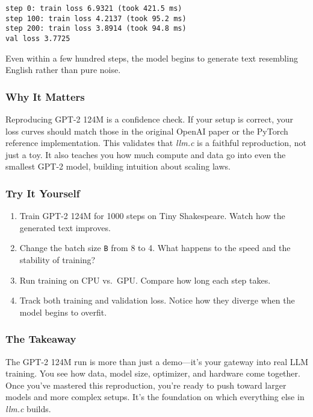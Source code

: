 \documentclass[
  letterpaper,
  DIV=11,
  numbers=noendperiod]{scrreprt}
\providecommand{\tightlist}{%
  \setlength{\itemsep}{0pt}\setlength{\parskip}{0pt}}
\begin{document}
\begin{verbatim}
step 0: train loss 6.9321 (took 421.5 ms)
step 100: train loss 4.2137 (took 95.2 ms)
step 200: train loss 3.8914 (took 94.8 ms)
val loss 3.7725
\end{verbatim}

Even within a few hundred steps, the model begins to generate text
resembling English rather than pure noise.

\subsubsection{Why It Matters}\label{why-it-matters-65}

Reproducing GPT-2 124M is a confidence check. If your setup is correct,
your loss curves should match those in the original OpenAI paper or the
PyTorch reference implementation. This validates that \emph{llm.c} is a
faithful reproduction, not just a toy. It also teaches you how much
compute and data go into even the smallest GPT-2 model, building
intuition about scaling laws.

\subsubsection{Try It Yourself}\label{try-it-yourself-79}

\begin{enumerate}
\def\labelenumi{\arabic{enumi}.}
\tightlist
\item
  Train GPT-2 124M for 1000 steps on Tiny Shakespeare. Watch how the
  generated text improves.
\item
  Change the batch size \texttt{B} from 8 to 4. What happens to the
  speed and the stability of training?
\item
  Run training on CPU vs.~GPU. Compare how long each step takes.
\item
  Track both training and validation loss. Notice how they diverge when
  the model begins to overfit.
\end{enumerate}

\subsubsection{The Takeaway}\label{the-takeaway-80}

The GPT-2 124M run is more than just a demo---it's your gateway into
real LLM training. You see how data, model size, optimizer, and hardware
come together. Once you've mastered this reproduction, you're ready to
push toward larger models and more complex setups. It's the foundation
on which everything else in \emph{llm.c} builds.
\end{document}
